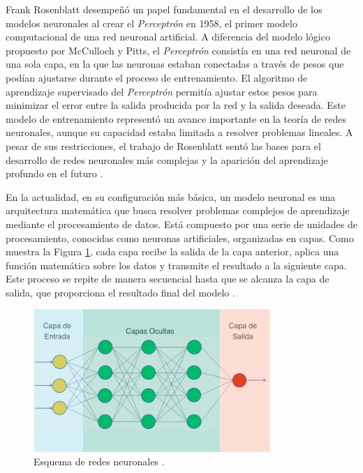 Frank Rosenblatt desempeñó un papel fundamental en el desarrollo de los modelos neuronales al crear el \textit{Perceptrón} en 1958, el primer modelo computacional de una red neuronal artificial. A diferencia del modelo lógico propuesto por McCulloch y Pitts, el \textit{Perceptrón} consistía en una red neuronal de una sola capa, en la que las neuronas estaban conectadas a través de pesos que podían ajustarse durante el proceso de entrenamiento. El algoritmo de aprendizaje supervisado del \textit{Perceptrón} permitía ajustar estos pesos para minimizar el error entre la salida producida por la red y la salida deseada. Este modelo de entrenamiento representó un avance importante en la teoría de redes neuronales, aunque su capacidad estaba limitada a resolver problemas lineales. A pesar de sus restricciones, el trabajo de Rosenblatt sentó las bases para el desarrollo de redes neuronales más complejas y la aparición del aprendizaje profundo en el futuro \cite{rosenblatt1958perceptron}.


En la actualidad, en su configuración más básica, un modelo neuronal es una arquitectura matemática que busca resolver problemas complejos de aprendizaje mediante el procesamiento de datos. Está compuesto por una serie de unidades de procesamiento, conocidas como neuronas artificiales, organizadas en capas. Como muestra la Figura \ref{fig:esq-capas}, cada capa recibe la salida de la capa anterior, aplica una función matemática sobre los datos y transmite el resultado a la siguiente capa. Este proceso se repite de manera secuencial hasta que se alcanza la capa de salida, que proporciona el resultado final del modelo \cite{bishop2006pattern}.

\begin{figure}[H]
    \centering
    \includegraphics[width=0.8\textwidth]{./img/modelo/capas.png}
    \caption{Esquema de redes neuronales \cite{aprendeia2021deep}.}
    \label{fig:esq-capas}
\end{figure}

